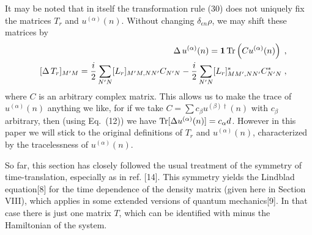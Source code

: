 It may be noted that in itself the transformation rule (30) does not uniquely fix the matrices $T_r$ and $u^{(\alpha)}(n)$.  Without changing $\delta_{\epsilon n}\rho$, we may shift these matrices by
\begin{eqnarray*}
&& \Delta \,u^{(\alpha)}(n)={\mbox{\boldmath{$1$}}}\,{\rm Tr}\left(C u^{(\alpha)}(n)\right)\;,\\
&& [\Delta \,T_r]_{M'M}=\frac{i}{2}\sum_{N'N} [L_r]_{M'M,NN'}C_{N'N}-\frac{i}{2}\sum_{N'N} [L_r]^*_{MM',NN'}C^*_{N'N}\;,
\end{eqnarray*}
where $C$ is an arbitrary complex matrix.  This allows us to make the trace of $u^{(\alpha)}(n)$ anything we like, for if we take $C=\sum c_\beta u^{(\beta)\dagger}(n)$ with $c_\beta$ arbitrary, then (using Eq.~(12)) we have ${\rm Tr}[\Delta u^{(\alpha)}(n)]=c_\alpha d$.  However in this paper we will stick to the original definitions of 
$T_r$ and $u^{(\alpha)}(n)$, characterized by the tracelessness of $u^{(\alpha)}(n)$.

So far,  this section has closely followed the usual treatment of the symmetry of time-translation, especially as in  ref. [14].  This symmetry  yields the Lindblad  equation[8] for the time dependence of the density matrix (given here in Section VIII), which applies in some extended versions of quantum mechanics[9].  In that case there is just one matrix  $T$, which can be identified with minus the Hamiltonian of the system.

